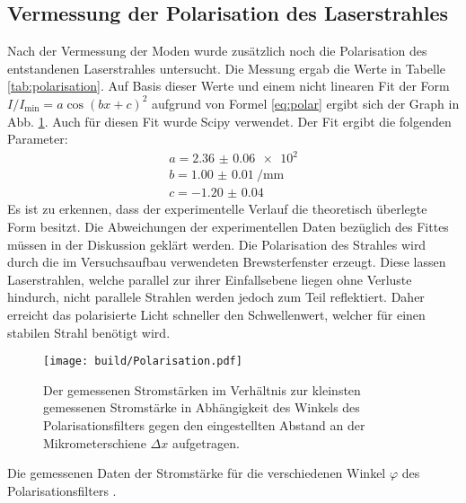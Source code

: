 \subsection{Vermessung der Polarisation des Laserstrahles}
Nach der Vermessung der Moden wurde zusätzlich noch die Polarisation des entstandenen Laserstrahles untersucht. Die Messung ergab die Werte in Tabelle \ref{tab:polarisation}. Auf Basis dieser Werte und einem nicht linearen Fit der Form $I/I_\text{min} = a  \cos(b x + c)^2$
 aufgrund von Formel \eqref{eq:polar} ergibt sich der Graph in Abb. \ref{fig:polarisation}. Auch für diesen Fit wurde Scipy \cite{scipy} verwendet. Der Fit ergibt die folgenden Parameter:
 \begin{gather*}
	a = \num{2.36(6)e2}\\
	b = \SI{1.00(1)}{\per\milli\meter}\\
	c = \num{-1.20(4)}
	\end{gather*}
Es ist zu erkennen, dass der experimentelle Verlauf die theoretisch überlegte Form besitzt. Die Abweichungen der experimentellen Daten bezüglich des Fittes müssen in der Diskussion geklärt werden. Die Polarisation des Strahles wird durch die im Versuchsaufbau verwendeten Brewsterfenster erzeugt. Diese lassen Laserstrahlen, welche parallel zur ihrer Einfallsebene liegen ohne Verluste hindurch, nicht parallele Strahlen werden jedoch zum Teil reflektiert. Daher erreicht das polarisierte Licht schneller den Schwellenwert, welcher für einen stabilen Strahl benötigt wird. 

\begin{figure}
	\centering
	\texttt{[image: build/Polarisation.pdf]}
	\caption{Der gemessenen Stromstärken im Verhältnis zur kleinsten gemessenen Stromstärke in Abhängigkeit des Winkels des Polarisationsfilters gegen den eingestellten Abstand an der Mikrometerschiene $\varDelta x$ aufgetragen.}
	\label{fig:polarisation}
\end{figure}


\begin{table}
	\centering
	\caption{Die gemessenen Daten der Stromstärke für die verschiedenen Winkel $\varphi$ des Polarisationsfilters .}
	
	\label{tab:polarisation}
\end{table}


